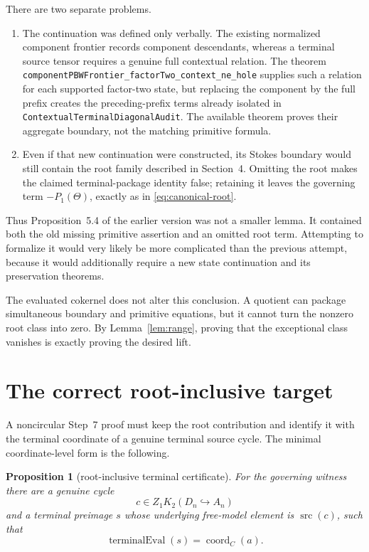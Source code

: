 \documentclass[11pt]{article}
\newtheorem{proposition}[theorem]{Proposition}
\theoremstyle{definition}
\theoremstyle{remark}
\newcommand{\src}{\operatorname{src}}
\begin{document}
There are two separate problems.
\begin{enumerate}
\item The continuation was defined only verbally.  The existing normalized
component frontier records component descendants, whereas a terminal source
tensor requires a genuine full contextual relation.  The theorem
\texttt{componentPBWFrontier\_factorTwo\_context\_ne\_hole} supplies such a
relation for each supported factor-two state, but replacing the component
by the full prefix creates the preceding-prefix terms already isolated in
\texttt{ContextualTerminalDiagonalAudit}.  The available theorem proves
their aggregate boundary, not the matching primitive formula.
\item Even if that new continuation were constructed, its Stokes boundary
would still contain the root family described in Section~4.  Omitting the
root makes the claimed terminal-package identity false; retaining it leaves
the governing term \(-P_1(\Theta)\), exactly as in
\eqref{eq:canonical-root}.
\end{enumerate}

Thus Proposition~5.4 of the earlier version was not a smaller lemma.  It
contained both the old missing primitive assertion and an omitted root
term.  Attempting to formalize it would very likely be more complicated
than the previous attempt, because it would additionally require a new
state continuation and its preservation theorems.

The evaluated cokernel does not alter this conclusion.  A quotient can
package simultaneous boundary and primitive equations, but it cannot turn
the nonzero root class into zero.  By Lemma~\ref{lem:range}, proving that
the exceptional class vanishes is exactly proving the desired lift.

\section{The correct root-inclusive target}

A noncircular Step~7 proof must keep the root contribution and identify it
with the terminal coordinate of a genuine terminal source cycle.  The
minimal coordinate-level form is the following.

\begin{proposition}[root-inclusive terminal certificate]\label{prop:correct-target}
For the governing witness there are a genuine cycle
\[
 c\in Z_1K_2(D_n\hookrightarrow A_n)
\]
and a terminal preimage \(s\) whose underlying free-model element is
\(\src(c)\), such that
\begin{equation}
 \operatorname{terminalEval}(s)
       =\operatorname{coord}_C(a).                          \label{eq:root-certificate}
\end{equation}
\end{proposition}
\end{document}
